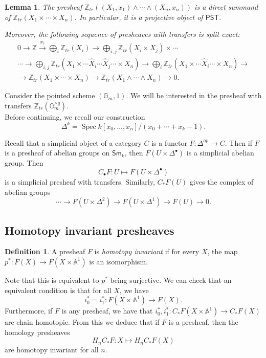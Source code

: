 \documentclass[leqno, openany]{memoir}
\newtheorem{lem}[thm]{Lemma}
\theoremstyle{definition}
\newtheorem{defn}[thm]{Definition}
\theoremstyle{remark}
\theoremstyle{plain}
\theoremstyle{definition}
\theoremstyle{remark}
\newcommand{\A}{\mathbb{A}}
\newcommand{\G}{\mathbb{G}}
\newcommand{\Z}{\mathbb{Z}}
\newcommand{\ms}[1]{\mathsf{#1}}
\newcommand{\wh}[1]{\widehat{#1}}
\newcommand{\Sm}{\mathsf{Sm}}
\DeclareMathOperator{\Spec}{Spec}
\begin{document}
\begin{lem}
    The presheaf $\Z_{tr}((X_1, x_1) \wedge \cdots \wedge (X_n, x_n))$ is a direct summand of $\Z_{tr}(X_1 \times \cdots \times X_n)$. In particular, it is a projective object of $\ms{PST}$.

    Moreover, the following sequence of presheaves with transfers is split-exact:
    \begin{align*}
        0 \to \Z \xrightarrow{x_i} \bigoplus_i \Z_{tr}(X_i) \to \bigoplus_{i,j} \Z_{tr}(X_i \times X_j) \times \cdots \\
              \cdots \to \bigoplus_{i,j} \Z_{tr}(X_1 \times \cdots \wh{X}_i \cdots \wh{X}_j \cdots \times X_n) \to \bigoplus_i \Z_{tr}(X_1 \times \cdots \wh{X}_i \cdots \times X_n) \to \\
              \to \Z_{tr}(X_1 \times \cdots \times X_n) \to \Z_{tr}(X_1 \wedge \cdots \wedge X_n) \to 0.
    \end{align*}
\end{lem}

Consider the pointed scheme $(\G_m, 1)$.  We will be interested in the presheaf with transfers $\Z_{tr}(\G_m^{\wedge q})$. \\ 

Before continuing, we recall our construction \[
\Delta^k = \Spec k[x_0, \ldots, x_n]/(x_0+\cdots +x_k-1).
\] 

Recall that a simplicial object of a category $C$ is a functor $F:\Delta^{op}\rightarrow C$.
Then if $F$ is a presheaf of abelian groups on $\Sm_k$, then $F(U\times\Delta^\bullet)$ is a simplicial abelian group.  Then 
\[
C_\bullet F: U\mapsto F(U\times \Delta^\bullet)
\]
is a simplicial presheaf with transfers.  Similarly, $C_*F(U)$ gives the complex of abelian groups 
\[
\cdots\rightarrow F(U\times \Delta^2)\rightarrow F(U\times \Delta^1)\rightarrow F(U)\rightarrow 0.
\]

\subsection{Homotopy invariant presheaves}

\begin{defn}
A presheaf $F$ is \textit{homotopy invariant} if for every $X$, the map $p^*:F(X)\rightarrow F(X\times \A^1)$ is an isomorphism.
\end{defn}

Note that this is equivalent to $p^*$ being surjective.  We can check that an equivalent condition is that for all $X$, we have 
\[
i_0^*=i_1^*:F(X\times \A^1)\rightarrow F(X).
\]
Furthermore, if $F$ is any presheaf, we have that $i_0^*, i_1^*:C_*F(X\times \A^1)\rightarrow C_*F(X)$ are chain homotopic.  From this we deduce that if $F$ is a presheaf, then the homology presheaves 
\[
H_nC_*F:X\mapsto H_nC_*F(X)
\]
are homotopy invariant for all $n$. 
\end{document}
